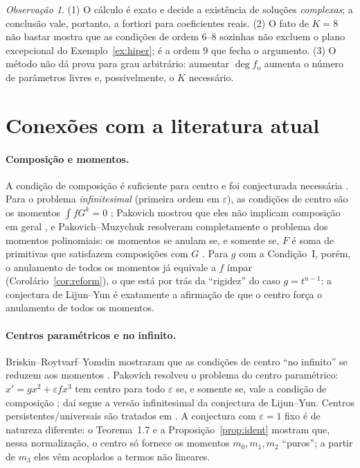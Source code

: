 \documentclass[11pt]{article}
\theoremstyle{plain}
\theoremstyle{definition}
\theoremstyle{remark}
\newtheorem{remark}[theorem]{Observação}
\newcommand{\fo}{f_{\mathrm o}}
\begin{document}
\begin{remark}
(1) O cálculo é exato e decide a existência de soluções \emph{complexas}; a
conclusão vale, portanto, a fortiori para coeficientes reais.
(2) O fato de $K=8$ não bastar mostra que as condições de ordem 6--8 sozinhas
não excluem o plano excepcional do Exemplo~\ref{ex:hiper}; é a ordem 9 que fecha o
argumento.
(3) O método não dá prova para grau arbitrário: aumentar $\deg\fo$ aumenta o
número de parâmetros livres e, possivelmente, o $K$ necessário.
\end{remark}

\section{Conexões com a literatura atual}\label{sec:lit}

\paragraph{Composição e momentos.}
A condição de composição é suficiente para centro \cite{AL87} e foi conjecturada
necessária \cite{BFY99,BFY00a,BFY00b,Chr00,Alw09}. Para o problema
\emph{infinitesimal} (primeira ordem em $\varepsilon$), as condições de centro
são os momentos $\int fG^k=0$ \cite{BFY00a}; Pakovich mostrou que eles não
implicam composição em geral \cite{Pak02}, e Pakovich--Muzychuk resolveram
completamente o problema dos momentos polinomiais: os momentos se anulam se, e
somente se, $F$ é soma de primitivas que satisfazem composições com $G$
\cite{PM09}. Para $g$ com a Condição~I, porém, o anulamento de todos os
momentos já equivale a $f$ ímpar (Corolário~\ref{cor:reform}), o que está por
trás da ``rigidez'' do caso $g=t^{n-1}$: a conjectura de Lijun--Yun é exatamente a
afirmação de que o centro força o anulamento de todos os momentos.

\paragraph{Centros paramétricos e no infinito.}
Briskin--Roytvarf--Yomdin mostraram que as condições de centro ``no infinito''
se reduzem aos momentos \cite{BRY10}. Pakovich resolveu o problema do centro
paramétrico: $x'=gx^2+\varepsilon fx^3$ tem centro para todo $\varepsilon$ se, e
somente se, vale a condição de composição \cite{Pak17}; daí segue a versão
infinitesimal da conjectura de Lijun--Yun. Centros persistentes/universais são
tratados em \cite{CGM12,GGL13}. A conjectura com $\varepsilon=1$ fixo é de
natureza diferente: o Teorema~1.7 e a Proposição~\ref{prop:ident} mostram que,
nessa normalização, o centro só fornece os momentos $m_0,m_1,m_2$ ``puros''; a
partir de $m_3$ eles vêm acoplados a termos não lineares.
\end{document}

